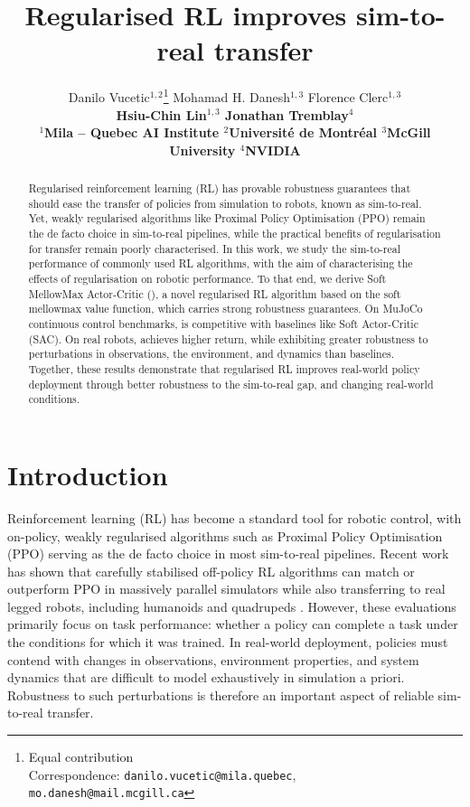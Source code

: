 \documentclass{article} %
\title{Regularised RL improves sim-to-real transfer}
\author{
Danilo Vucetic$^{1,2}$\thanks{Equal contribution\\ \hspace*{1.8em}Correspondence: \texttt{danilo.vucetic@mila.quebec}, \texttt{mo.danesh@mail.mcgill.ca}}
\quad
Mohamad H. Danesh$^{1,3}$\footnotemark[1]
\quad
Florence Clerc$^{1,3}$
\\
\bfseries
Hsiu-Chin Lin$^{1,3}$
\quad
Jonathan Tremblay$^{4}$
\\[2mm]
$^{1}$Mila -- Quebec AI Institute
\quad
$^{2}$Université de Montréal
\quad
$^{3}$McGill University
\quad
$^{4}$NVIDIA
}
\begin{document}
\maketitle

\begin{abstract}
    Regularised reinforcement learning (RL) has provable robustness guarantees that should ease the transfer of policies from simulation to robots, known as sim-to-real.
    Yet, weakly regularised algorithms like Proximal Policy Optimisation (PPO) remain the de facto choice in sim-to-real pipelines, while the practical benefits of regularisation for transfer remain poorly characterised.
    In this work, we study the sim-to-real performance of commonly used RL algorithms, with the aim of characterising the effects of regularisation on robotic performance.
    To that end, we derive Soft MellowMax Actor-Critic (\ourMethod), a novel regularised RL algorithm based on the soft mellowmax value function, which carries strong robustness guarantees.
    On MuJoCo continuous control benchmarks, \ourMethod is competitive with baselines like Soft Actor-Critic (SAC).
    On real robots, \ourMethod achieves higher return, while exhibiting greater robustness to perturbations in observations, the environment, and dynamics than baselines.
    Together, these results demonstrate that regularised RL improves real-world policy deployment through better robustness to the sim-to-real gap, and changing real-world conditions. 
\end{abstract}

\section{Introduction}\label{sec:intro}

    Reinforcement learning (RL) has become a standard tool for robotic control, with on-policy, weakly regularised algorithms such as Proximal Policy Optimisation (PPO) \citep{schulman2017proximal_PPO} serving as the de facto choice in most sim-to-real pipelines.
    Recent work has shown that carefully stabilised off-policy RL algorithms can match or outperform PPO in massively parallel simulators while also transferring to real legged robots, including humanoids and quadrupeds \citep{gallici2025simplifying_pqn, seo2025learning_fastsac, seo2025fasttd3, kim2026flashsac, rslrlsac2026bridging}.
    However, these evaluations primarily focus on task performance: whether a policy can complete a task under the conditions for which it was trained. In real-world deployment, policies must contend with changes in observations, environment properties, and system dynamics that are difficult to model exhaustively in simulation a priori. Robustness to such perturbations is therefore an important aspect of reliable sim-to-real transfer.
\end{document}
